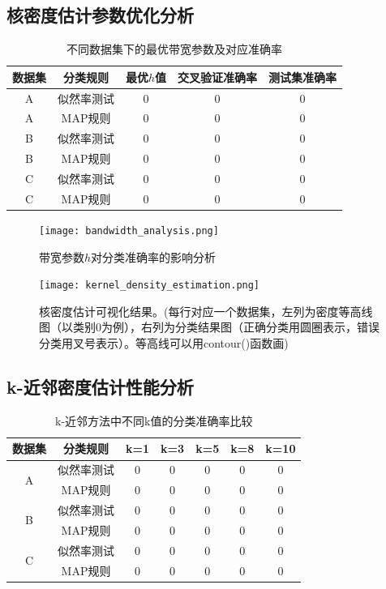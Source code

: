 \documentclass[12pt]{article}
\begin{document}
\subsection{核密度估计参数优化分析}

\begin{table}[htbp]
\centering
\caption{不同数据集下的最优带宽参数及对应准确率}
\begin{tabular}{ccccc}
\toprule
数据集 & 分类规则 & 最优$h$值 & 交叉验证准确率 & 测试集准确率 \\
\midrule
A & 似然率测试 & 0 & 0 & 0 \\
A & MAP规则 & 0 & 0 & 0 \\
B & 似然率测试 & 0 & 0 & 0 \\
B & MAP规则 & 0 & 0 & 0 \\
C & 似然率测试 & 0 & 0 & 0 \\
C & MAP规则 & 0 & 0 & 0 \\
\bottomrule
\end{tabular}
\end{table}

\begin{figure}[htbp]
\centering
\texttt{[image: bandwidth\_analysis.png]}
\caption{带宽参数$h$对分类准确率的影响分析}
\label{fig:bandwidth_analysis}
\end{figure}

\begin{figure}[htbp]
\centering
\texttt{[image: kernel\_density\_estimation.png]}
\caption{核密度估计可视化结果。(每行对应一个数据集，左列为密度等高线图（以类别0为例），右列为分类结果图（正确分类用圆圈表示，错误分类用叉号表示）。等高线可以用contour()函数画)}
\label{fig:kernel_density}
\end{figure}

\subsection{k-近邻密度估计性能分析}

\begin{table}[htbp]
\centering
\caption{k-近邻方法中不同k值的分类准确率比较}
\begin{tabular}{ccccccc}
\toprule
数据集 & 分类规则 & k=1 & k=3 & k=5 & k=8 & k=10 \\
\midrule
\multirow{2}{*}{A} & 似然率测试 & 0 & 0 & 0 & 0 & 0 \\
& MAP规则 & 0 & 0 & 0 & 0 & 0 \\
\midrule
\multirow{2}{*}{B} & 似然率测试 & 0 & 0 & 0 & 0 & 0 \\
& MAP规则 & 0 & 0 & 0 & 0 & 0 \\
\midrule
\multirow{2}{*}{C} & 似然率测试 & 0 & 0 & 0 & 0 & 0 \\
& MAP规则 & 0 & 0 & 0 & 0 & 0 \\
\bottomrule
\end{tabular}
\end{table}
\end{document}
